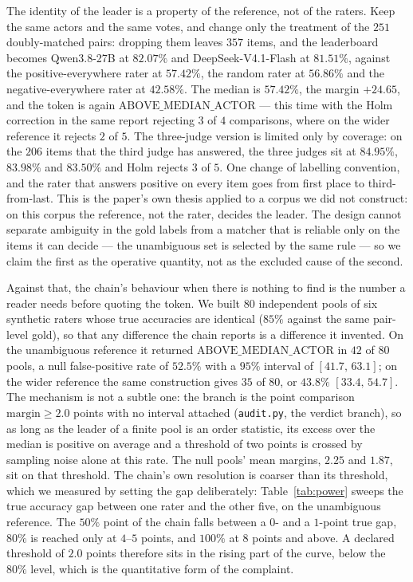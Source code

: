 \documentclass{article}
\newcommand{\ids}[1]{\texttt{\small #1}} %
\begin{document}
The identity of the leader is a property of the reference, not of the raters. Keep the same actors and the same votes, and change only the treatment of the $251$ doubly-matched pairs: dropping them leaves $357$ items, and the leaderboard becomes Qwen3.8-27B at $82.07\%$ and DeepSeek-V4.1-Flash at $81.51\%$, against the positive-everywhere rater at $57.42\%$, the random rater at $56.86\%$ and the negative-everywhere rater at $42.58\%$. The median is $57.42\%$, the margin $+24.65$, and the token is again $\mathrm{ABOVE\_MEDIAN\_ACTOR}$ --- this time with the Holm correction in the same report rejecting $3$ of $4$ comparisons, where on the wider reference it rejects $2$ of $5$. The three-judge version is limited only by coverage: on the $206$ items that the third judge has answered, the three judges sit at $84.95\%$, $83.98\%$ and $83.50\%$ and Holm rejects $3$ of $5$. One change of labelling convention, and the rater that answers positive on every item goes from first place to third-from-last. This is the paper's own thesis applied to a corpus we did not construct: on this corpus the reference, not the rater, decides the leader. The design cannot separate ambiguity in the gold labels from a matcher that is reliable only on the items it can decide --- the unambiguous set is selected by the same rule --- so we claim the first as the operative quantity, not as the excluded cause of the second.

Against that, the chain's behaviour when there is nothing to find is the number a reader needs before quoting the token. We built $80$ independent pools of six synthetic raters whose true accuracies are identical ($85\%$ against the same pair-level gold), so that any difference the chain reports is a difference it invented. On the unambiguous reference it returned $\mathrm{ABOVE\_MEDIAN\_ACTOR}$ in $42$ of $80$ pools, a null false-positive rate of $52.5\%$ with a $95\%$ interval of $[41.7,\,63.1]$; on the wider reference the same construction gives $35$ of $80$, or $43.8\%$ $[33.4,\,54.7]$. The mechanism is not a subtle one: the branch is the point comparison $\mathrm{margin} \ge 2.0$ points with no interval attached (\ids{audit.py}, the verdict branch), so as long as the leader of a finite pool is an order statistic, its excess over the median is positive on average and a threshold of two points is crossed by sampling noise alone at this rate. The null pools' mean margins, $2.25$ and $1.87$, sit on that threshold. The chain's own resolution is coarser than its threshold, which we measured by setting the gap deliberately: Table~\ref{tab:power} sweeps the true accuracy gap between one rater and the other five, on the unambiguous reference. The $50\%$ point of the chain falls between a $0$- and a $1$-point true gap, $80\%$ is reached only at $4$--$5$ points, and $100\%$ at $8$ points and above. A declared threshold of $2.0$ points therefore sits in the rising part of the curve, below the $80\%$ level, which is the quantitative form of the complaint.
\end{document}
